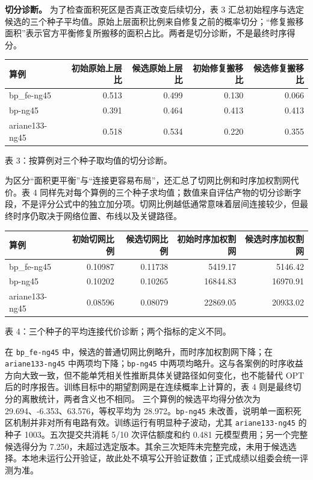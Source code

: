 \documentclass[UTF8,a4paper,11pt]{ctexart}
\begin{document}
\textbf{切分诊断。} 为了检查面积死区是否真正改变后续切分，表 3 汇总初始程序与选定候选的三个种子平均值。原始上层面积比例来自修复之前的概率切分；“修复搬移面积”表示官方平衡修复所搬移的面积占比。两者是切分诊断，不是最终时序得分。
\begin{center}\small
\begin{tabular}{lrrrr}
\toprule
算例 & 初始原始上层比 & 候选原始上层比 & 初始修复搬移比 & 候选修复搬移比\\
\midrule
bp\_fe-ng45 & 0.513 & 0.499 & 0.130 & 0.066\\
bp-ng45 & 0.391 & 0.464 & 0.413 & 0.413\\
ariane133-ng45 & 0.518 & 0.534 & 0.220 & 0.355\\
\bottomrule
\end{tabular}\par
\smallskip 表 3：按算例对三个种子取均值的切分诊断。
\end{center}
为区分“面积更平衡”与“连接更容易布局”，还汇总了切网比例和时序加权割网代价。表 4 同样先对每个算例的三个种子求均值；数值来自评估产物的切分诊断字段，不是评分公式中的独立加分项。切网比例越低通常意味着层间连接较少，但最终时序仍取决于网络位置、布线以及关键路径。
\begin{center}\small
\begin{tabular}{lrrrr}
\toprule
算例 & 初始切网比例 & 候选切网比例 & 初始时序加权割网 & 候选时序加权割网\\
\midrule
bp\_fe-ng45 & 0.10987 & 0.11738 & 5419.17 & 5146.42\\
bp-ng45 & 0.10202 & 0.10265 & 16844.83 & 16970.91\\
ariane133-ng45 & 0.08596 & 0.08079 & 22869.05 & 20933.02\\
\bottomrule
\end{tabular}\par
\smallskip 表 4：三个种子的平均连接代价诊断；两个指标的定义不同。
\end{center}
在 \texttt{bp\_fe-ng45} 中，候选的普通切网比例略升，而时序加权割网下降；在 \texttt{ariane133-ng45} 中两项均下降；\texttt{bp-ng45} 中两项均略升。这与各案例的时序收益方向大致一致，但不能单凭相关性推断具体关键路径如何变化，也不能替代 OPT 后的时序报告。训练目标中的期望割网是在连续概率上计算的，表 4 则是最终切分的离散统计，两者含义也不相同。
三个算例的候选平均得分依次为 29.694、-6.353、63.576，等权平均为 28.972。\texttt{bp-ng45} 未改善，说明单一面积死区机制并非对所有电路有效。训练运行有明显种子波动，尤其 \texttt{ariane133-ng45} 的种子 1003。五次提交共消耗 5/10 次评估额度和约 0.481 元模型费用；另一个完整候选得分为 7.250，未超过选定版本。其余三次矩阵未完整完成，未用于候选选择。本地未运行公开验证，故此处不填写公开验证数值；正式成绩以组委会统一评测为准。
\end{document}
